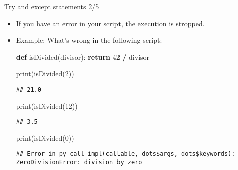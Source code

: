 \documentclass[
  8pt,
  ignorenonframetext,
]{beamer}
\newenvironment{Shaded}{\begin{snugshade}}{\end{snugshade}}
\newcommand{\BuiltInTok}[1]{#1}
\newcommand{\ControlFlowTok}[1]{\textcolor[rgb]{0.13,0.29,0.53}{\textbf{#1}}}
\newcommand{\DecValTok}[1]{\textcolor[rgb]{0.00,0.00,0.81}{#1}}
\newcommand{\KeywordTok}[1]{\textcolor[rgb]{0.13,0.29,0.53}{\textbf{#1}}}
\newcommand{\NormalTok}[1]{#1}
\newcommand{\OperatorTok}[1]{\textcolor[rgb]{0.81,0.36,0.00}{\textbf{#1}}}
\begin{document}
\begin{frame}[fragile]{Try and except statements 2/5}
\protect\hypertarget{try-and-except-statements-25}{}
\begin{itemize}
\item
  If you have an error in your script, the execution is stropped.
\item
  Example: What's wrong in the following script:

\begin{Shaded}
\begin{Highlighting}[]
\KeywordTok{def}\NormalTok{ isDivided(divisor):}
    \ControlFlowTok{return} \DecValTok{42} \OperatorTok{/}\NormalTok{ divisor}

\BuiltInTok{print}\NormalTok{(isDivided(}\DecValTok{2}\NormalTok{))}
\end{Highlighting}
\end{Shaded}

\begin{verbatim}
## 21.0
\end{verbatim}

\begin{Shaded}
\begin{Highlighting}[]
\BuiltInTok{print}\NormalTok{(isDivided(}\DecValTok{12}\NormalTok{))}
\end{Highlighting}
\end{Shaded}

\begin{verbatim}
## 3.5
\end{verbatim}

\begin{Shaded}
\begin{Highlighting}[]
\BuiltInTok{print}\NormalTok{(isDivided(}\DecValTok{0}\NormalTok{))}
\end{Highlighting}
\end{Shaded}

\begin{verbatim}
## Error in py_call_impl(callable, dots$args, dots$keywords): ZeroDivisionError: division by zero
\end{verbatim}
\end{itemize}
\end{frame}
\end{document}
